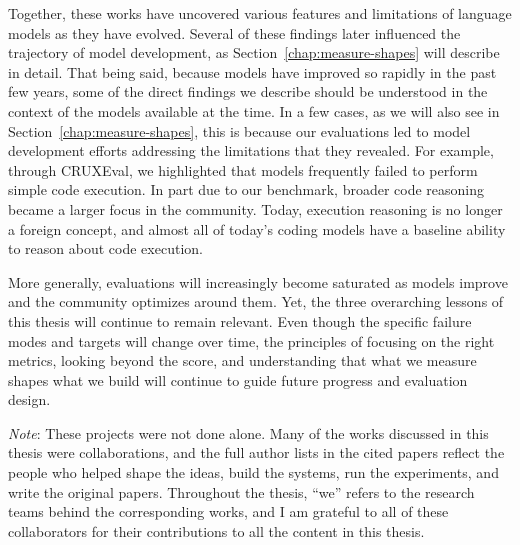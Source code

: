 Together, these works have uncovered various features and limitations of language models as they have evolved.
Several of these findings later influenced the trajectory of model development, as Section~\ref{chap:measure-shapes} will describe in detail. 
That being said, because models have improved so rapidly in the past few years, some of the direct findings we describe should be understood in the context of the models available at the time. 
In a few cases, as we will also see in Section~\ref{chap:measure-shapes},
this is because our evaluations led to model development efforts addressing the limitations that they revealed. 
For example, through CRUXEval, we highlighted that models frequently failed to perform simple code execution. In part due to our benchmark,
broader code reasoning became a larger focus in the community. 
Today, execution reasoning is no longer a foreign concept, and almost all of today's coding models have a baseline ability to reason about
code execution. 

More generally, evaluations will increasingly become saturated as models improve and the community
optimizes around them. Yet, the three overarching lessons of this thesis will continue to remain relevant.
Even though the specific failure modes and targets will change over time, the principles of focusing on the right metrics, 
looking beyond the score, and understanding that what we measure shapes what we build will 
continue to guide future progress and evaluation design.

\textit{Note}: These projects were not done alone. Many of the works discussed in this thesis were collaborations,
and the full author lists in the cited papers reflect the people who helped shape the ideas, build the
systems, run the experiments, and write the original papers. Throughout the thesis, ``we'' refers to the research teams behind the corresponding
works, and I am grateful to all of these collaborators for their contributions to all the content in this thesis.
